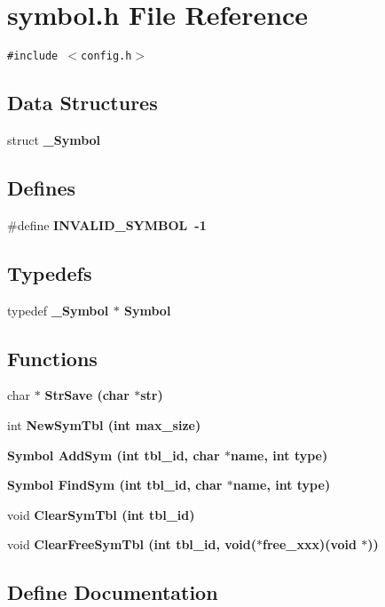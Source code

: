 \section{symbol.h File Reference}
\label{symbol_8h}
{\tt \#include $<$config.h$>$}\par
\subsection*{Data Structures}
\begin{CompactItemize}
\item 
struct \bf{\_\-Symbol}
\end{CompactItemize}
\subsection*{Defines}
\begin{CompactItemize}
\item 
\#define \bf{INVALID\_\-SYMBOL}~-1
\end{CompactItemize}
\subsection*{Typedefs}
\begin{CompactItemize}
\item 
typedef \bf{\_\-Symbol} $\ast$ \bf{Symbol}
\end{CompactItemize}
\subsection*{Functions}
\begin{CompactItemize}
\item 
char $\ast$ \bf{Str\-Save} (char $\ast$str)
\item 
int \bf{New\-Sym\-Tbl} (int max\_\-size)
\item 
\bf{Symbol} \bf{Add\-Sym} (int tbl\_\-id, char $\ast$\bf{name}, int type)
\item 
\bf{Symbol} \bf{Find\-Sym} (int tbl\_\-id, char $\ast$\bf{name}, int type)
\item 
void \bf{Clear\-Sym\-Tbl} (int tbl\_\-id)
\item 
void \bf{Clear\-Free\-Sym\-Tbl} (int tbl\_\-id, void($\ast$free\_\-xxx)(void $\ast$))
\end{CompactItemize}


\subsection{Define Documentation}
